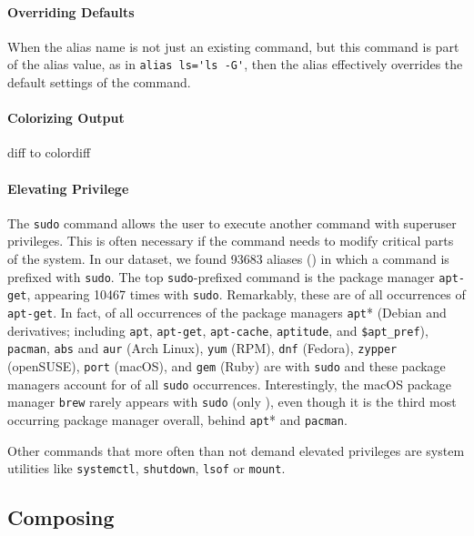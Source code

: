 \paragraph{\bf Overriding Defaults}

When the alias name is not just an existing command, but this command is part of the alias value, as in \verb|alias ls='ls -G'|, then the alias effectively overrides the default settings of the command.


\paragraph{\bf Colorizing Output}

\TODO diff to colordiff

\paragraph{\bf Elevating Privilege}

The \verb|sudo| command allows the user to execute another command with superuser privileges.
This is often necessary if the command needs to modify critical parts of the system.
In our dataset, we found \num{93683} aliases () in which a command is prefixed with \verb|sudo|.
The top \texttt{sudo}-prefixed command is the package manager \verb|apt-get|, appearing \num{10467} times with \verb|sudo|.
Remarkably, these are  of all occurrences of \verb|apt-get|.
In fact,  of all occurrences of the package managers \verb|apt|* (Debian and derivatives; including \verb|apt|, \verb|apt-get|, \verb|apt-cache|, \verb|aptitude|, and \verb|$apt_pref|), \verb|pacman|, \verb|abs| and \verb|aur| (Arch Linux), \verb|yum| (RPM), \verb|dnf| (Fedora), \verb|zypper| (openSUSE), \verb|port| (macOS), and \verb|gem| (Ruby) are with \verb|sudo| and these package managers account for  of all \verb|sudo| occurrences.
Interestingly, the macOS package manager \verb|brew| rarely appears with \verb|sudo| (only ), even though it is the third most occurring package manager overall, behind \verb|apt|* and \verb|pacman|.

Other commands that more often than not demand elevated privileges are system utilities like \verb|systemctl|, \verb|shutdown|, \verb|lsof| or \verb|mount|.

\subsection{Composing}

